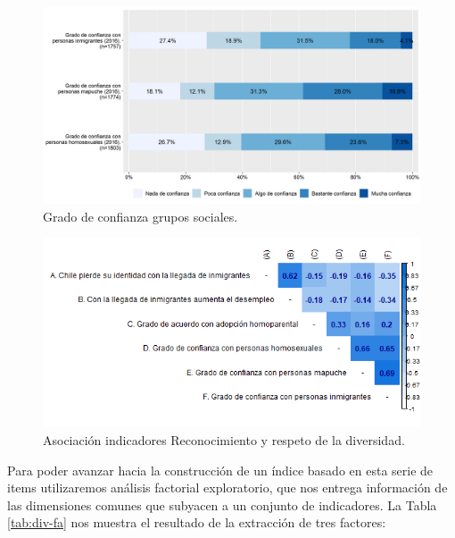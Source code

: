\documentclass[
  12pt,
]{book}
\begin{document}
\begin{figure}[H]

{\centering \includegraphics[width=1\linewidth,height=1\textheight]{output/graphs/diversidad} 

}

\caption{Grado de confianza grupos sociales.}\label{fig:diversidad}
\end{figure}

\begin{figure}[H]

{\centering \includegraphics[width=1\linewidth,height=1\textheight]{output/graphs/diversidad_cor} 

}

\caption{Asociación indicadores Reconocimiento y respeto de la diversidad.}\label{fig:diversidad-cor}
\end{figure}

Para poder avanzar hacia la construcción de un índice basado en esta serie de items utilizaremos análisis factorial exploratorio, que nos entrega información de las dimensiones comunes que subyacen a un conjunto de indicadores. La Tabla \ref{tab:div-fa} nos muestra el resultado de la extracción de tres factores:
\end{document}
